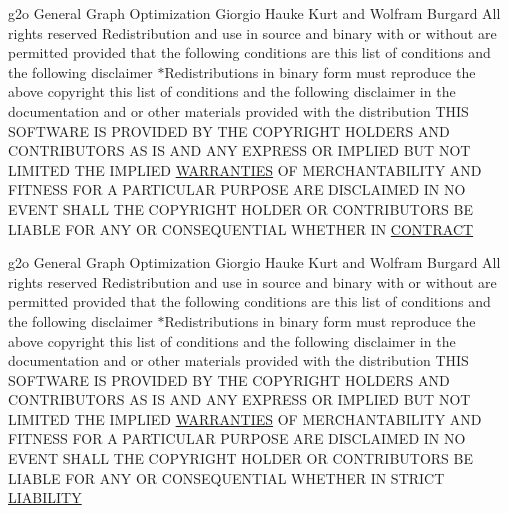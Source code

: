 \begin{DoxyCompactItemize}
g2o General Graph Optimization Giorgio Hauke Kurt and Wolfram Burgard All rights reserved Redistribution and use in source and binary with or without are permitted provided that the following conditions are this list of conditions and the following disclaimer $\ast$Redistributions in binary form must reproduce the above copyright this list of conditions and the following disclaimer in the documentation and or other materials provided with the distribution T\+H\+IS S\+O\+F\+T\+W\+A\+RE IS P\+R\+O\+V\+I\+D\+ED BY T\+HE C\+O\+P\+Y\+R\+I\+G\+HT H\+O\+L\+D\+E\+RS A\+ND C\+O\+N\+T\+R\+I\+B\+U\+T\+O\+RS AS IS A\+ND A\+NY E\+X\+P\+R\+E\+SS OR I\+M\+P\+L\+I\+ED B\+UT N\+OT L\+I\+M\+I\+T\+ED T\+HE I\+M\+P\+L\+I\+ED \hyperlink{license-bsd_8txt_aada97a6c44c9b8b4b0cfb3a641d0fe51}{W\+A\+R\+R\+A\+N\+T\+I\+ES} OF M\+E\+R\+C\+H\+A\+N\+T\+A\+B\+I\+L\+I\+TY A\+ND F\+I\+T\+N\+E\+SS F\+OR A P\+A\+R\+T\+I\+C\+U\+L\+AR P\+U\+R\+P\+O\+SE A\+RE D\+I\+S\+C\+L\+A\+I\+M\+ED IN NO E\+V\+E\+NT S\+H\+A\+LL T\+HE C\+O\+P\+Y\+R\+I\+G\+HT H\+O\+L\+D\+ER OR C\+O\+N\+T\+R\+I\+B\+U\+T\+O\+RS BE L\+I\+A\+B\+LE F\+OR A\+NY OR C\+O\+N\+S\+E\+Q\+U\+E\+N\+T\+I\+AL W\+H\+E\+T\+H\+ER IN \hyperlink{license-bsd_8txt_a7baf31f6ddb167c8cb580e4f3dd03f91}{C\+O\+N\+T\+R\+A\+CT}
\item 
g2o General Graph Optimization Giorgio Hauke Kurt and Wolfram Burgard All rights reserved Redistribution and use in source and binary with or without are permitted provided that the following conditions are this list of conditions and the following disclaimer $\ast$Redistributions in binary form must reproduce the above copyright this list of conditions and the following disclaimer in the documentation and or other materials provided with the distribution T\+H\+IS S\+O\+F\+T\+W\+A\+RE IS P\+R\+O\+V\+I\+D\+ED BY T\+HE C\+O\+P\+Y\+R\+I\+G\+HT H\+O\+L\+D\+E\+RS A\+ND C\+O\+N\+T\+R\+I\+B\+U\+T\+O\+RS AS IS A\+ND A\+NY E\+X\+P\+R\+E\+SS OR I\+M\+P\+L\+I\+ED B\+UT N\+OT L\+I\+M\+I\+T\+ED T\+HE I\+M\+P\+L\+I\+ED \hyperlink{license-bsd_8txt_aada97a6c44c9b8b4b0cfb3a641d0fe51}{W\+A\+R\+R\+A\+N\+T\+I\+ES} OF M\+E\+R\+C\+H\+A\+N\+T\+A\+B\+I\+L\+I\+TY A\+ND F\+I\+T\+N\+E\+SS F\+OR A P\+A\+R\+T\+I\+C\+U\+L\+AR P\+U\+R\+P\+O\+SE A\+RE D\+I\+S\+C\+L\+A\+I\+M\+ED IN NO E\+V\+E\+NT S\+H\+A\+LL T\+HE C\+O\+P\+Y\+R\+I\+G\+HT H\+O\+L\+D\+ER OR C\+O\+N\+T\+R\+I\+B\+U\+T\+O\+RS BE L\+I\+A\+B\+LE F\+OR A\+NY OR C\+O\+N\+S\+E\+Q\+U\+E\+N\+T\+I\+AL W\+H\+E\+T\+H\+ER IN S\+T\+R\+I\+CT \hyperlink{license-bsd_8txt_ae0cc4cec2fa18cd51df7738e4178f88b}{L\+I\+A\+B\+I\+L\+I\+TY}
\end{DoxyCompactItemize}


